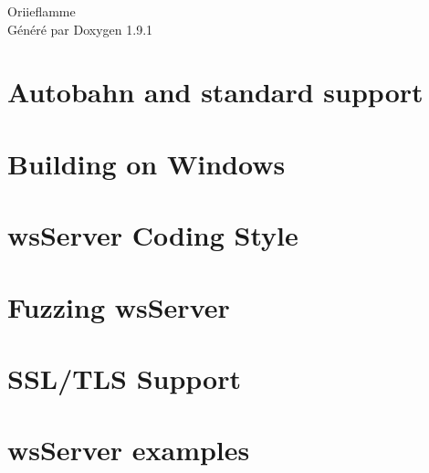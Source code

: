 \let\mypdfximage\pdfximage\def\pdfximage{\immediate\mypdfximage}\documentclass[twoside]{book}
\newcommand{\+}{\discretionary{\mbox{\scriptsize$\hookleftarrow$}}{}{}}
\newcommand{\clearemptydoublepage}{%
  \newpage{\pagestyle{empty}\cleardoublepage}%
}
\begin{document}
\raggedbottom

\hypersetup{pageanchor=false,
             bookmarksnumbered=true,
             pdfencoding=unicode
            }
\begin{titlepage}
\vspace*{7cm}
\begin{center}%
{\Large Oriieflamme }\\
\vspace*{1cm}
{\large Généré par Doxygen 1.9.1}\\
\end{center}
\end{titlepage}
\clearemptydoublepage
{}
\tableofcontents
\clearemptydoublepage
{}
\hypersetup{pageanchor=true}

\chapter{Autobahn and standard support}
\label{md_lib_wsServer_doc_AUTOBAHN}

\chapter{Building on Windows}
\label{md_lib_wsServer_doc_BUILD_WINDOWS}

\chapter{ws\+Server Coding Style}
\label{md_lib_wsServer_doc_CODING_STYLE}

\chapter{Fuzzing ws\+Server}
\label{md_lib_wsServer_doc_FUZZING}

\chapter{SSL/\+TLS Support}
\label{md_lib_wsServer_doc_TLS}

\chapter{ws\+Server examples}
\label{md_lib_wsServer_examples_README}

\end{document}
